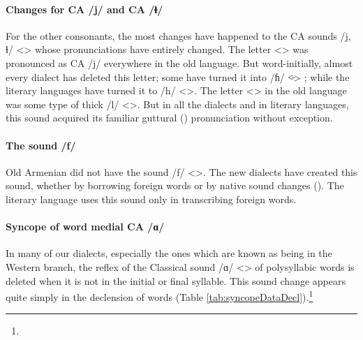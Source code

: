 \paragraph{Changes for CA /j/ and CA /ɫ/}\label{sec:AdjarianIntro:difference:soundChange:VelarGlide}

For the other consonants, the most changes have happened to the CA sounds /j, ɫ/ <> whose pronunciations have entirely changed. The letter <> was pronounced as CA /j/ everywhere in the old language. But word-initially, almost every dialect has deleted this letter; some have turned it into /ɦ/ <̵> ; while the literary languages have turned it to /h/ <>. The letter <> in the old language was some type of thick /l/ <>.  But in all the dialects and in literary languages, this sound acquired its familiar guttural () pronunciation without exception. 

\paragraph{The sound /f/}

Old Armenian did not have the sound /f/ <>. The new dialects have created this sound, whether by borrowing foreign words or by native sound changes (). The literary language uses this sound only in transcribing foreign words. 

\paragraph{Syncope of word medial CA /ɑ/}

In many of our dialects, especially the ones which are known as being in the Western branch, the reflex of the Classical sound /ɑ/ <> of polysyllabic words is deleted when it is not in the initial or final syllable. This sound change appears quite simply in the declension of words (Table \ref{tab:syncopeDataDecl}).\footnote{}


